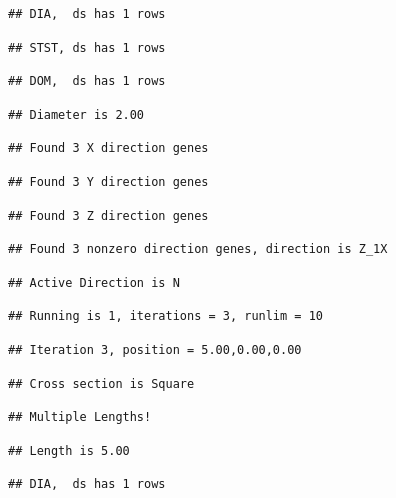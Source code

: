 \documentclass[]{article}
\begin{document}
\begin{verbatim}
## DIA,  ds has 1 rows
\end{verbatim}

\begin{verbatim}
## STST, ds has 1 rows
\end{verbatim}

\begin{verbatim}
## DOM,  ds has 1 rows
\end{verbatim}

\begin{verbatim}
## Diameter is 2.00
\end{verbatim}

\begin{verbatim}
## Found 3 X direction genes
\end{verbatim}

\begin{verbatim}
## Found 3 Y direction genes
\end{verbatim}

\begin{verbatim}
## Found 3 Z direction genes
\end{verbatim}

\begin{verbatim}
## Found 3 nonzero direction genes, direction is Z_1X
\end{verbatim}

\begin{verbatim}
## Active Direction is N
\end{verbatim}

\begin{verbatim}
## Running is 1, iterations = 3, runlim = 10
\end{verbatim}

\begin{verbatim}
## Iteration 3, position = 5.00,0.00,0.00
\end{verbatim}

\begin{verbatim}
## Cross section is Square
\end{verbatim}

\begin{verbatim}
## Multiple Lengths!
\end{verbatim}

\begin{verbatim}
## Length is 5.00
\end{verbatim}

\begin{verbatim}
## DIA,  ds has 1 rows
\end{verbatim}
\end{document}
